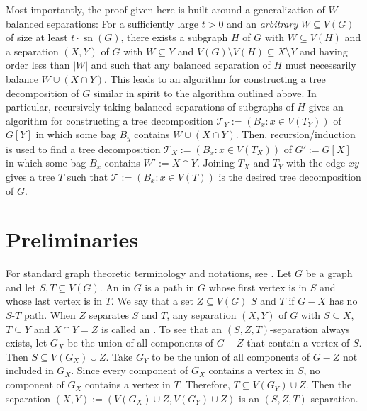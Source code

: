 \documentclass{patmorin}
\DeclareMathOperator{\sep}{sn}
\begin{document}
Most importantly, the proof given here is built around a generalization of $W$-balanced separations:  For a sufficiently large $t>0$ and an \emph{arbitrary} $W\subseteq V(G)$ of size at least $t\cdot \sep(G)$, there exists a subgraph $H$ of $G$ with $W\subseteq V(H)$ and a separation $(X,Y)$ of $G$ with $W\subseteq Y$ and $V(G)\setminus V(H)\subseteq X\setminus Y$ and having order less than $|W|$ and such that any balanced separation of $H$ must necessarily balance $W\cup (X\cap Y)$.  This leads to an algorithm for constructing a tree decomposition of $G$ similar in spirit to the algorithm outlined above.
In particular, recursively taking balanced separations of subgraphs of $H$ gives an algorithm for constructing a tree decomposition $\mathcal{T}_Y:=(B_x:x\in V(T_Y))$ of $G[Y]$ in which some bag $B_y$ contains $W\cup (X\cap Y)$.  Then, recursion/induction is used to find a tree decomposition $\mathcal{T}_X:=(B_x:x\in V(T_X))$ of $G':=G[X]$ in which some bag $B_x$ contains $W':=X\cap Y$.  Joining $T_X$ and $T_Y$ with the edge $xy$ gives a tree $T$ such that $\mathcal{T}:=(B_x:x\in V(T))$ is the desired tree decomposition of $G$.


\section{Preliminaries}

For standard graph theoretic terminology and notations, see \citet{diestel2017graph}.
Let $G$ be a graph and let $S,T\subseteq V(G)$. An  in $G$ is a path in $G$ whose first vertex is in $S$ and whose last vertex is in $T$.  We say that a set $Z\subseteq V(G)$  $S$ and $T$ if $G-X$ has no $S$-$T$ path.  When $Z$ separates $S$ and $T$, any separation $(X,Y)$ of $G$ with $S\subseteq X$, $T\subseteq Y$ and $X\cap Y=Z$ is called an . To see that an $(S,Z,T)$-separation always exists, let $G_X$ be the union of all components of $G-Z$ that contain a vertex of $S$. Then $S\subseteq V(G_X)\cup Z$. Take $G_Y$ to be the union of all components of $G-Z$ not included in $G_X$. Since  every component of $G_X$ contains a vertex in $S$, no component of $G_X$ contains a vertex in $T$.  Therefore, $T\subseteq V(G_Y)\cup Z$.  Then the separation $(X,Y):=(V(G_X)\cup Z, V(G_Y)\cup Z)$ is an $(S,Z,T)$-separation.
\end{document}
